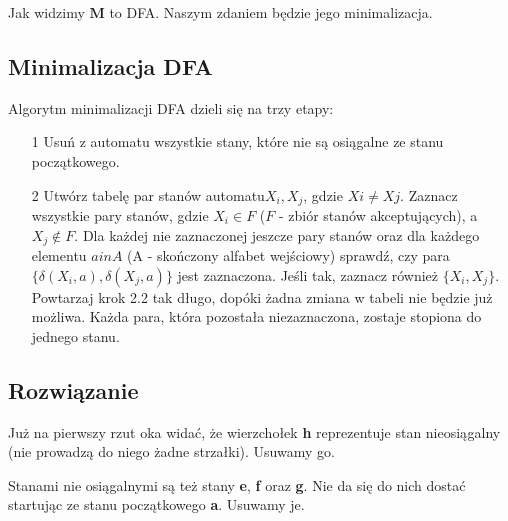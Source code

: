 \documentclass[10pt,a4paper, polish]{report}
\begin{document}
Jak widzimy $\textbf{M}$ to DFA. Naszym zdaniem będzie jego minimalizacja.


\subsection*{Minimalizacja DFA}
Algorytm minimalizacji DFA dzieli się na trzy etapy:
\begin{itemize}
    \item[1] Usuń z automatu wszystkie stany, które nie są osiągalne ze stanu początkowego.
    \item[2] Utwórz tabelę par stanów automatu$X_{i},X_{j}$, gdzie $X i \neq X j$.
     Zaznacz wszystkie pary stanów, gdzie $X_i \in F$ ($F$ - zbiór stanów akceptujących), a $X_j \notin F$.
     Dla każdej nie zaznaczonej jeszcze pary stanów oraz dla każdego elementu $a in A$ (A - skończony alfabet wejściowy) sprawdź, czy para $\lbrace\delta(X_i,a),\delta(X_j,a)\rbrace$ jest zaznaczona. Jeśli tak, zaznacz również $\lbrace X_i, X_j\rbrace$.
     Powtarzaj krok 2.2 tak długo, dopóki żadna zmiana w tabeli nie będzie już możliwa.
     Każda para, która pozostała niezaznaczona, zostaje stopiona do jednego stanu.
\end{itemize}
\subsection*{Rozwiązanie}
Już na pierwszy rzut oka widać, że wierzchołek \textbf{h} reprezentuje stan nieosiągalny (nie prowadzą do niego żadne strzałki). Usuwamy go.

Stanami nie osiągalnymi są też stany \textbf{e}, \textbf{f} oraz \textbf{g}. Nie da się do nich dostać startując ze stanu początkowego \textbf{a}. Usuwamy je.
\end{document}
